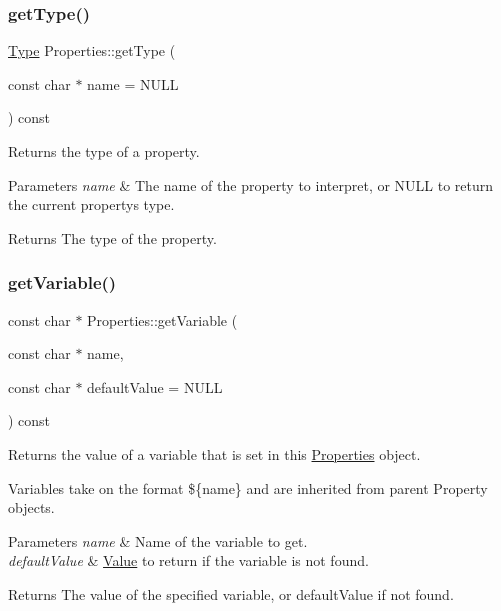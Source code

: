 \subsubsection{\texorpdfstring{get\+Type()}{getType()}\hspace{0.1cm}{\footnotesize\ttfamily [2/2]}}
{\footnotesize\ttfamily \hyperlink{classProperties_a2d14cc7f8d9f987905632969cc4070e9}{Type} Properties\+::get\+Type (\begin{DoxyParamCaption}\item[{const char $\ast$}]{name = {\ttfamily NULL} }\end{DoxyParamCaption}) const}

Returns the type of a property.


\begin{DoxyParams}{Parameters}
{\em name} & The name of the property to interpret, or N\+U\+LL to return the current property\textquotesingle{}s type.\\
\hline
\end{DoxyParams}
\begin{DoxyReturn}{Returns}
The type of the property. 
\end{DoxyReturn}
\mbox{\label{classProperties_add5e270ee2eb7795384e7712e21c3846}} 
\subsubsection{\texorpdfstring{get\+Variable()}{getVariable()}\hspace{0.1cm}{\footnotesize\ttfamily [1/2]}}
{\footnotesize\ttfamily const char $\ast$ Properties\+::get\+Variable (\begin{DoxyParamCaption}\item[{const char $\ast$}]{name,  }\item[{const char $\ast$}]{default\+Value = {\ttfamily NULL} }\end{DoxyParamCaption}) const}

Returns the value of a variable that is set in this \hyperlink{classProperties}{Properties} object.

Variables take on the format \$\{name\} and are inherited from parent Property objects.


\begin{DoxyParams}{Parameters}
{\em name} & Name of the variable to get. \\
\hline
{\em default\+Value} & \hyperlink{classValue}{Value} to return if the variable is not found.\\
\hline
\end{DoxyParams}
\begin{DoxyReturn}{Returns}
The value of the specified variable, or default\+Value if not found. 
\end{DoxyReturn}
\mbox{\label{classProperties_a8fca7902048c6e6af24c0f6697fcd2dd}} 
